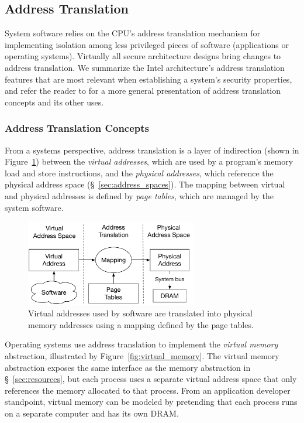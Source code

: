 \subsection{Address Translation}
\label{sec:paging}


System software relies on the CPU's address translation mechanism for
implementing isolation among less privileged pieces of software (applications
or operating systems). Virtually all secure architecture designs bring changes
to address translation. We summarize the Intel architecture's address
translation features that are most relevant when establishing a system's
security properties, and refer the reader to \cite{jacob1998virtual} for a more
general presentation of address translation concepts and its other uses.


\subsubsection{Address Translation Concepts}
\label{sec:paging_vpn}
\label{sec:paging_ppn}

From a systems perspective, address translation is a layer of indirection
(shown in Figure~\ref{fig:address_translation}) between the
\textit{virtual addresses}, which are used by a program's memory load and store
instructions, and the \textit{physical addresses}, which reference the physical
address space (\S~\ref{sec:address_spaces}). The mapping between virtual and
physical addresses is defined by \textit{page tables}, which are managed by the
system software.

\begin{figure}[hbt]
  \centering
  \includegraphics[width=75mm]{figures/address_translation.pdf}
  \caption{
    Virtual addresses used by software are translated into physical memory
    addresses using a mapping defined by the page tables.
  }
  \label{fig:address_translation}
\end{figure}

Operating systems use address translation to implement the \textit{virtual
memory} abstraction, illustrated by Figure~\ref{fig:virtual_memory}. The
virtual memory abstraction exposes the same interface as the memory abstraction
in \S~\ref{sec:resources}, but each process uses a separate virtual address
space that only references the memory allocated to that process. From an
application developer standpoint, virtual memory can be modeled by pretending
that each process runs on a separate computer and has its own DRAM.


